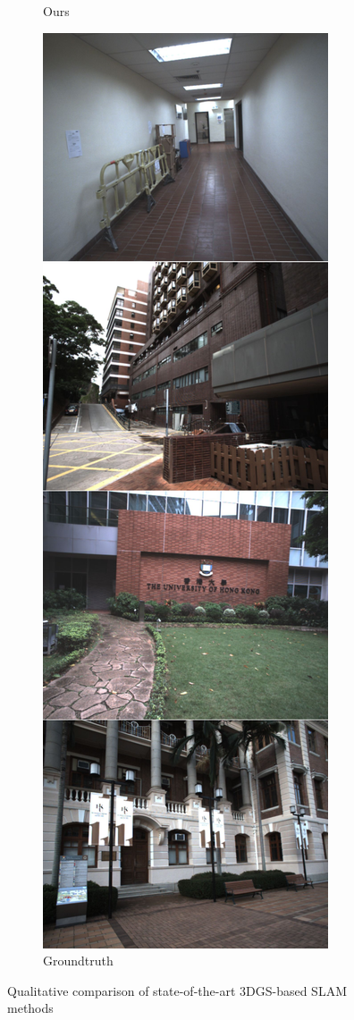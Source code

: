 \documentclass[lettersize,journal]{IEEEtran}
\begin{document}
\begin{figure}[!p]
\begin{subfigure}{0.23\textwidth}
        \caption{Ours}
        \label{fig:qualitativecomparisonours}
    \end{subfigure}
    \hspace{0.005\textwidth} %
    \begin{subfigure}{0.23\textwidth} %
        \centering
        \includegraphics[width=\linewidth]{image/qualitative/groundtruth.pdf}
        \caption{Groundtruth}
        \label{fig:qualitativecomparisongroundtruth}
    \end{subfigure}
    \caption{Qualitative comparison of state-of-the-art 3DGS-based SLAM methods}
    \label{fig:qualitativecomparison}
    \vfill %
\end{figure}
\end{document}
